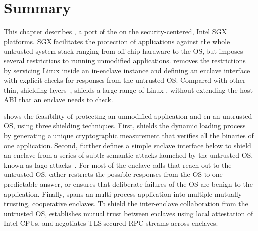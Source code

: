 \section{Summary}

This chapter describes \graphenesgx{},
a port of the \graphene{} \libos{} on the security-centered, Intel SGX platforms.
SGX facilitates the protection of applications
against the whole untrusted system stack ranging from off-chip hardware to the OS,
but imposes several restrictions to running unmodified applications.
\graphenesgx{} removes the restrictions
by servicing Linux \linuxapis{} inside an in-enclave \libos{} instance and defining an enclave interface with explicit checks for responses from the untrusted OS.
Compared with other thin, shielding layers~\cite{osdi16scone,shinde17panoply}, \graphenesgx{} shields a large range of Linux \linuxapis{},
without extending the host ABI that an enclave needs to check.



\graphenesgx{} shows the feasibility
of protecting an unmodified application and \libos{} on an untrusted OS, using three shielding techniques.
First, \graphenesgx{}
shields the dynamic loading process
by generating a unique cryptographic measurement that verifies all the binaries of one application.
Second, \graphenesgx{} further defines a simple
enclave interface
below \thehostabi{} to shield an enclave from a series of subtle semantic attacks
launched by the untrusted OS, known as Iago attacks~\cite{checkoway13iago}.
For most of the enclave calls that reach out to the untrusted OS,
\graphenesgx{} either restricts the possible responses
from the OS to one predictable answer,
or ensures that deliberate failures of the OS are benign to the application.
Finally, \graphenesgx{} spans an multi-process application
into multiple mutually-trusting, cooperative enclaves.
To shield the inter-enclave collaboration from the untrusted OS,
\graphenesgx{} establishes mutual trust between enclaves
using local attestation of Intel CPUs,
and negotiates TLS-secured RPC streams across enclaves.


